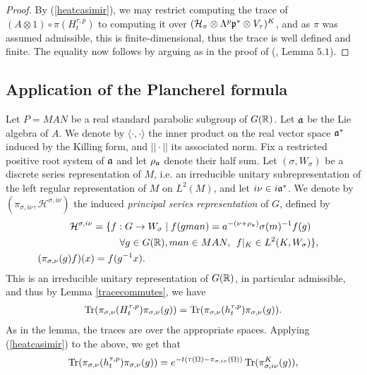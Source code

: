 \begin{proof}
    By (\ref{heatcasimir}), we may restrict computing the trace of $(A\otimes 1)\circ \pi(H_t^{\tau,p})$ to computing it over $(\mathcal{H}_\pi\otimes \Lambda^p\mathfrak{p}^*\otimes V_\tau)^K$, and as $\pi$ was assumed admissible, this is finite-dimensional, thus the trace is well defined and finite. The equality now follows by arguing as in the proof of (\cite{BM}, Lemma $5.1$).
\end{proof}

\subsection{Application of the Plancherel formula}

Let $P=MAN$ be a real standard parabolic subgroup of $G(\mathbb{R})$. Let $\mathfrak{a}$ be the Lie algebra of $A$. We denote by $\langle\cdot,\cdot\rangle$ the inner product on the real vector space $\mathfrak{a}^*$ induced by the Killing form, and $||\cdot||$ its associated norm. Fix a restricted positive root system of $\mathfrak{a}$ and let $\rho_{\mathfrak{a}}$ denote their half sum. Let $(\sigma,W_\sigma)$ be a discrete series representation of $M$, i.e. an irreducible unitary subrepresentation of the left regular representation of $M$ on $L^2(M)$, and let $i\nu\in i\mathfrak{a}^*$. We denote by $(\pi_{\sigma,i\nu},\mathcal{H}^{\sigma,i\nu})$ the induced \emph{principal series representation} of $G$, defined by
\begin{align*}
    \mathcal{H}^{\sigma,i\nu}=\lbrace f:G\to W_\sigma \mid f(gman) = a^{-(\nu+\rho_{\mf{a}})}\sigma(m)^{-1}f(g) \\
    \:\forall g\in G(\R), man\in MAN,\:\: f|_{K}\in L^2(K,W_\sigma)&\rbrace, \\
    (\pi_{\sigma,\nu}(g)f)(x) = f(g^{-1} x).\hspace{16.8em}
\end{align*}
This is an irreducible unitary representation of $G(\mathbb{R})$, in particular admissible, and thus by Lemma \ref{tracecommutes}, we have
\begin{align}\label{traceheat}
    \operatorname{Tr}(\pi_{\sigma,\nu}(H_t^{\tau,p})\pi_{\sigma,\nu}(g)) = \operatorname{Tr}(\pi_{\sigma,\nu}(h_t^{\tau,p})\pi_{\sigma,\nu}(g)).
\end{align}
As in the lemma, the traces are over the appropriate spaces. Applying (\ref{heatcasimir}) to the above, we get that 
\begin{align}\label{planchereltrace}
    \operatorname{Tr}(\pi_{\sigma,\nu}(h_t^{\tau,p})\pi_{\sigma,\nu}(g)) = e^{-t(\tau(\Omega)-\pi_{\sigma,i\nu}(\Omega))} \operatorname{Tr}(\pi_{\sigma,i\nu}^K(g)),
\end{align}
